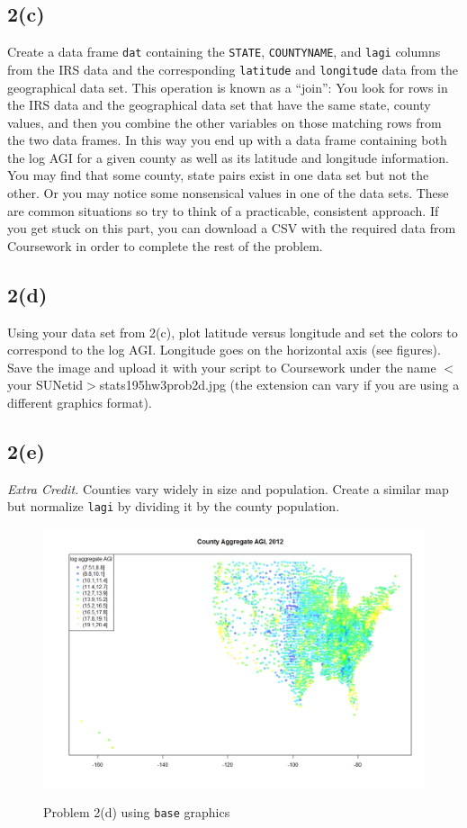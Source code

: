 \documentclass[11pt]{article}
\theoremstyle{plain}
\theoremstyle{definition}
\begin{document}
\subsection*{2(c)}
Create a data frame \texttt{dat} containing the \texttt{STATE},
\texttt{COUNTYNAME}, and \texttt{lagi} columns from the IRS data and
the corresponding \texttt{latitude} and \texttt{longitude} data from
the geographical data set. This operation is known as a ``join'': You
look for rows in the IRS data and the geographical data set that have
the same state, county values, and then you combine the other variables on those matching rows from the two data frames. In this way you end up with a data frame containing both the log AGI for a given county as well as its latitude and longitude information.
You may find that some county, state pairs exist in one data set but
not the other. Or you may notice some nonsensical values in one of the
data sets. These are common situations so try to think of a
practicable, consistent approach. If you get stuck on this part, you can download a CSV with the required data from Coursework in order to complete the rest of the problem.

\subsection*{2(d)}
Using your data set from 2(c), plot latitude versus longitude and set the colors to correspond to the log AGI. Longitude goes on the horizontal axis (see figures). Save the image and upload it with your script to Coursework under the name $<$your SUNetid$>$stats195hw3prob2d.jpg (the extension can vary if you are using a different graphics format).

\subsection*{2(e)} \emph{Extra Credit.} Counties vary widely in size
and population. Create a similar map but normalize \texttt{lagi} by
dividing it by the county population.

\begin{figure}[p]
	\includegraphics[scale=.6]{"hw3prob2c-1"}
	\label{}
	\caption{Problem 2(d) using \texttt{base} graphics}
\end{figure}
\end{document}
